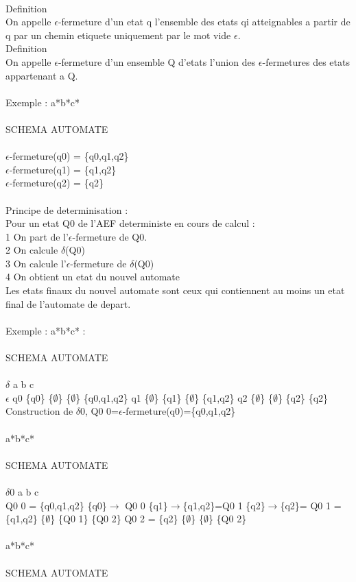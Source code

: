 \documentclass[5pt]{article}
\begin{document}
\begin{scriptsize}
\\
Definition\\
On appelle $\epsilon$-fermeture d’un etat q l’ensemble des etats qi atteignables a partir de q par un chemin etiquete uniquement par le mot vide $\epsilon$.\\
Definition\\
On appelle $\epsilon$-fermeture d’un ensemble Q d’etats l’union des $\epsilon$-fermetures des etats appartenant a Q.\\
\\
Exemple : a*b*c*\\
\\
SCHEMA AUTOMATE\\
\\
$\epsilon$-fermeture(q0) = \{q0,q1,q2\}\\
$\epsilon$-fermeture(q1) = \{q1,q2\}\\
$\epsilon$-fermeture(q2) = \{q2\}\\
\\
Principe de determinisation :\\
Pour un etat Q0 de l’AEF deterministe en cours de calcul :\\
1 On part de l’$\epsilon$-fermeture de Q0.\\
2 On calcule $\delta$(Q0)\\
3 On calcule l’$\epsilon$-fermeture de $\delta$(Q0)\\
4 On obtient un etat du nouvel automate\\
Les etats finaux du nouvel automate sont ceux qui contiennent au moins un etat final de l’automate de depart.\\
\\
Exemple : a*b*c* :\\
\\
SCHEMA AUTOMATE\\
\\
$\delta$ a b c\\
$\epsilon$ q0 \{q0\} \{$\emptyset$\} \{$\emptyset$\} \{q0,q1,q2\} q1 \{$\emptyset$\} \{q1\} \{$\emptyset$\} \{q1,q2\} q2 \{$\emptyset$\} \{$\emptyset$\} \{q2\} \{q2\}\\
Construction de $\delta$0, Q0 0=$\epsilon$-fermeture(q0)=\{q0,q1,q2\}\\
\\
a*b*c*\\
\\
SCHEMA AUTOMATE\\
\\
$\delta$0 a b c\\
Q0 0 = \{q0,q1,q2\} \{q0\}$\rightarrow$ Q0 0 \{q1\}$\rightarrow$\{q1,q2\}=Q0 1 \{q2\}$\rightarrow$\{q2\}= Q0 1 = \{q1,q2\} \{$\emptyset$\} \{Q0 1\} \{Q0 2\} Q0 2 = \{q2\} \{$\emptyset$\} \{$\emptyset$\} \{Q0 2\}\\
\\
a*b*c*\\
\\
SCHEMA AUTOMATE\\
\\

\end{scriptsize}
\end{document}
